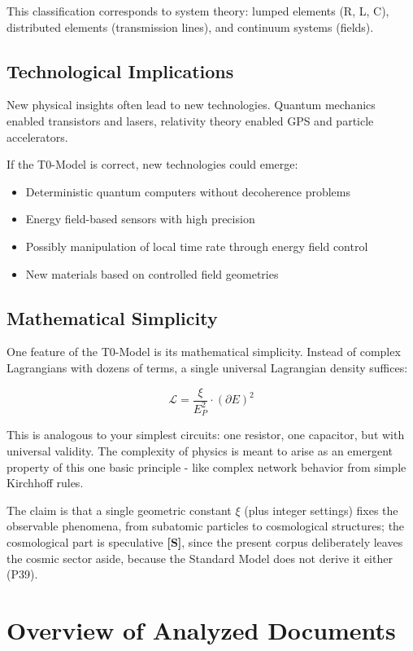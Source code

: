 This classification corresponds to system theory: lumped elements (R, L, C), distributed elements (transmission lines), and continuum systems (fields).

\subsection{Technological Implications}

New physical insights often lead to new technologies. Quantum mechanics enabled transistors and lasers, relativity theory enabled GPS and particle accelerators.

If the T0-Model is correct, new technologies could emerge:
\begin{itemize}
	\item Deterministic quantum computers without decoherence problems
	\item Energy field-based sensors with high precision
	\item Possibly manipulation of local time rate through energy field control
	\item New materials based on controlled field geometries
\end{itemize}

\subsection{Mathematical Simplicity}

One feature of the T0-Model is its mathematical simplicity. Instead of complex Lagrangians with dozens of terms, a single universal Lagrangian density suffices:

$$\mathcal{L} = \frac{\xi}{E_P^2} \cdot (\partial E)^2$$

This is analogous to your simplest circuits: one resistor, one capacitor, but with universal validity. The complexity of physics is meant to arise as an emergent property of this one basic principle - like complex network behavior from simple Kirchhoff rules.

The claim is that a single geometric constant $\xi$ (plus integer settings) fixes the observable phenomena, from subatomic particles to cosmological structures; the cosmological part is speculative \textbf{[S]}, since the present corpus deliberately leaves the cosmic sector aside, because the Standard Model does not derive it either (P39).	
\section{Overview of Analyzed Documents}

